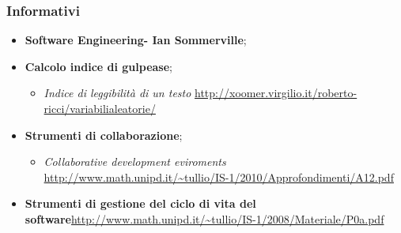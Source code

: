 \subsubsection{Informativi}
\begin{itemize}
\item \textbf{Software Engineering- Ian Sommerville};
\item \textbf{Calcolo indice di gulpease};
	\begin{itemize} 
	\item \textit{Indice di leggibilità di un testo} \url{http://xoomer.virgilio.it/roberto-ricci/variabilialeatorie/}
	\end{itemize}
\item \textbf{Strumenti di collaborazione};
	\begin{itemize} 
	\item \textit{Collaborative development eviroments} \url{http://www.math.unipd.it/~tullio/IS-1/2010/Approfondimenti/A12.pdf}
	\end{itemize}
\item \textbf{Strumenti di gestione del ciclo di vita del software}\url{http://www.math.unipd.it/~tullio/IS-1/2008/Materiale/P0a.pdf}

\end{itemize}
